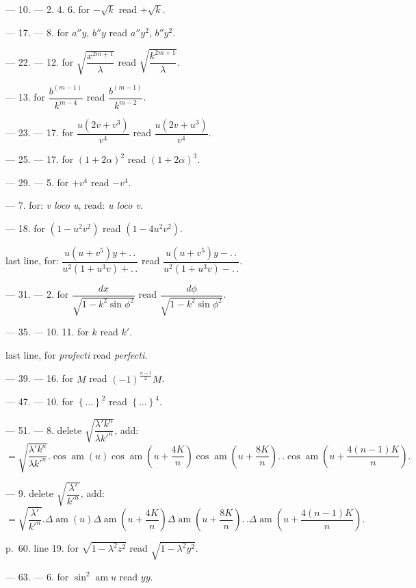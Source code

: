 \documentclass{article}
\begin{document}
--- 10. --- 2. 4. 6. for $-\sqrt{k}$ read $+\sqrt{k}$.

--- 17. --- 8. for $a''y$, $b''y$ read $a''y^{2}$, $b''y^{2}$.

--- 22. --- 12. for $\sqrt{\dfrac{x^{2m+1}}{\lambda}}$ read $\sqrt{\dfrac{k^{2m+1}}{\lambda}}$.

--- 13. for $\dfrac{b^{(m-1)}}{k^{m-4}}$ read $\dfrac{b^{(m-1)}}{k^{m-2}}$.

--- 23. --- 17. for $\dfrac{u(2v+v^{3})}{v^{4}}$ read $\dfrac{u(2v+u^{3})}{v^{4}}$.

--- 25. --- 17. for $(1+2\alpha)^{2}$ read $(1+2\alpha)^{3}$.

--- 29. --- 5. for $+v^{4}$ read $-v^{4}$.

--- 7. for: \emph{v loco u}, read: \emph{u loco v}.

--- 18. for $(1-u^{2}v^{2})$ read $(1-4u^{2}v^{2})$.

last line, for: $\dfrac{u(u+v^{5})y+.\,.}{u^{2}(1+u^{3}v)+.\,.}$ read $\dfrac{u(u+v^{5})y-.\,.}{u^{2}(1+u^{3}v)-.\,.}$.

--- 31. --- 2. for $\dfrac{dx}{\sqrt{1-k^{2}\sin\phi^{2}}}$ read $\dfrac{d\phi}{\sqrt{1-k^{2}\sin\phi^{2}}}$.

--- 35. --- 10. 11. for $k$ read $k'$.

last line, for \emph{profecti} read \emph{perfecti}.

--- 39. --- 16. for $M$ read $(-1)^{\frac{n-1}{2}}M$.

--- 47. --- 10. for $\left\{\ldots\right\}^{2}$ read $\left\{\ldots\right\}^{4}$.

--- 51. --- 8. delete $\sqrt{\dfrac{\lambda'k^{n}}{\lambda k'^{n}}}$, add:
\[
=\sqrt{\frac{\lambda'k^{n}}{\lambda k'^{n}}}.\cos\operatorname{am}(u)\cos\operatorname{am}\left(u+\frac{4K}{n}\right)\cos\operatorname{am}\left(u+\frac{8K}{n}\right).\,.\cos\operatorname{am}\left(u+\frac{4(n-1)K}{n}\right).
\]

--- 9. delete $\sqrt{\dfrac{\lambda'}{k'^{n}}}$, add:
\[
=\sqrt{\frac{\lambda'}{k'^{n}}}.\Delta\operatorname{am}(u)\Delta\operatorname{am}\left(u+\frac{4K}{n}\right)\Delta\operatorname{am}\left(u+\frac{8K}{n}\right).\,.\Delta\operatorname{am}\left(u+\frac{4(n-1)K}{n}\right).
\]


p.\ 60. line 19. for $\sqrt{1-\lambda^{2}z^{2}}$ read $\sqrt{1-\lambda^{2}y^{2}}$.

--- 63. --- 6. for $\sin^{2}\operatorname{am}u$ read $yy$.
\end{document}
